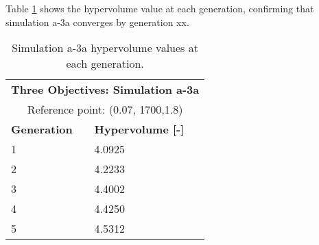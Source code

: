 Table \ref{tab:a3a-hypervolume} shows the hypervolume value at each generation, 
confirming that simulation a-3a converges by generation xx. 
\begin{table}[htbp!]
    \centering
    \onehalfspacing
    \caption{Simulation a-3a hypervolume values at each generation.}
	\label{tab:a3a-hypervolume}
    \footnotesize
    \begin{tabular}{ll}
    \hline 
    \multicolumn{2}{c}{\textbf{Three Objectives: Simulation a-3a}} \\
    \multicolumn{2}{c}{Reference point: (0.07, 1700,1.8)} \\
    \hline 
    \textbf{Generation} & \textbf{Hypervolume [-]} \\
    \hline
    1 & 4.0925 \\
    2 & 4.2233 \\
    3 & 4.4002 \\
    4 & 4.4250 \\
    5 & 4.5312 \\
    \hline
    \end{tabular}
\end{table}

